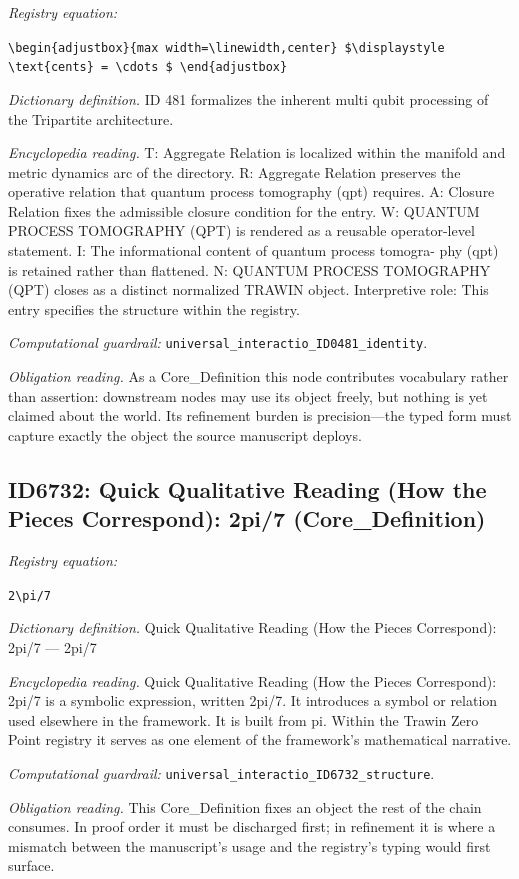 \documentclass[11pt]{article}
\theoremstyle{remark}
\begin{document}
\noindent\textit{Registry equation:}\par
{\small\texttt{\textbackslash{}begin\{adjustbox\}\{max width=\textbackslash{}linewidth,center\} \$\textbackslash{}displaystyle \textbackslash{}text\{cents\} = \textbackslash{}cdots \$ \textbackslash{}end\{adjustbox\}}}\par\medskip
\noindent\textit{Dictionary definition.} ID 481 formalizes the inherent multi qubit processing of the Tripartite architecture.\par\medskip
\noindent\textit{Encyclopedia reading.} T: Aggregate Relation is localized within the manifold and metric dynamics arc of the directory. R: Aggregate Relation preserves the operative relation that quantum process tomography (qpt) requires. A: Closure Relation fixes the admissible closure condition for the entry. W: QUANTUM PROCESS TOMOGRAPHY (QPT) is rendered as a reusable operator-level statement. I: The informational content of quantum process tomogra- phy (qpt) is retained rather than flattened. N: QUANTUM PROCESS TOMOGRAPHY (QPT) closes as a distinct normalized TRAWIN object. Interpretive role: This entry specifies the structure within the registry.
\par\medskip\noindent\textit{Computational guardrail:} \texttt{universal\_interactio\_ID0481\_identity}.
\par\medskip\noindent\textit{Obligation reading.} As a Core\_Definition this node contributes vocabulary rather than assertion: downstream nodes may use its object freely, but nothing is yet claimed about the world. Its refinement burden is precision---the typed form must capture exactly the object the source manuscript deploys.

\subsection{ID6732: Quick Qualitative Reading (How the Pieces Correspond): 2pi/7 (Core\_Definition)}

\noindent\textit{Registry equation:}\par
{\small\texttt{2\textbackslash{}pi/7}}\par\medskip
\noindent\textit{Dictionary definition.} Quick Qualitative Reading (How the Pieces Correspond): 2pi/7 --- 2pi/7\par\medskip
\noindent\textit{Encyclopedia reading.} Quick Qualitative Reading (How the Pieces Correspond): 2pi/7 is a symbolic expression, written 2pi/7. It introduces a symbol or relation used elsewhere in the framework. It is built from pi. Within the Trawin Zero Point registry it serves as one element of the framework's mathematical narrative.
\par\medskip\noindent\textit{Computational guardrail:} \texttt{universal\_interactio\_ID6732\_structure}.
\par\medskip\noindent\textit{Obligation reading.} This Core\_Definition fixes an object the rest of the chain consumes. In proof order it must be discharged first; in refinement it is where a mismatch between the manuscript's usage and the registry's typing would first surface.
\end{document}
